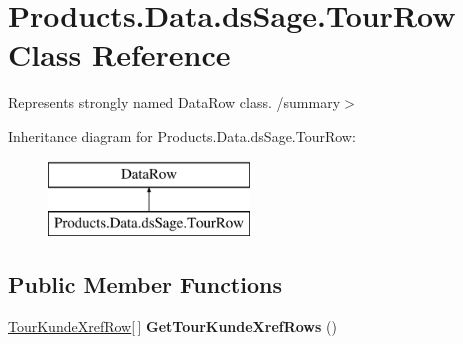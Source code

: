 \hypertarget{class_products_1_1_data_1_1ds_sage_1_1_tour_row}{}\section{Products.\+Data.\+ds\+Sage.\+Tour\+Row Class Reference}
\label{class_products_1_1_data_1_1ds_sage_1_1_tour_row}


Represents strongly named Data\+Row class. /summary$>$  


Inheritance diagram for Products.\+Data.\+ds\+Sage.\+Tour\+Row\+:\begin{figure}[H]
\begin{center}
\leavevmode
\includegraphics[height=2.000000cm]{class_products_1_1_data_1_1ds_sage_1_1_tour_row}
\end{center}
\end{figure}
\subsection*{Public Member Functions}
\begin{DoxyCompactItemize}
\item 
\hyperlink{class_products_1_1_data_1_1ds_sage_1_1_tour_kunde_xref_row}{Tour\+Kunde\+Xref\+Row}\mbox{[}$\,$\mbox{]} {\bfseries Get\+Tour\+Kunde\+Xref\+Rows} ()\hypertarget{class_products_1_1_data_1_1ds_sage_1_1_tour_row_a71267b14518d7a6b452f779580b59c7a}{}\label{class_products_1_1_data_1_1ds_sage_1_1_tour_row_a71267b14518d7a6b452f779580b59c7a}

\end{DoxyCompactItemize}
